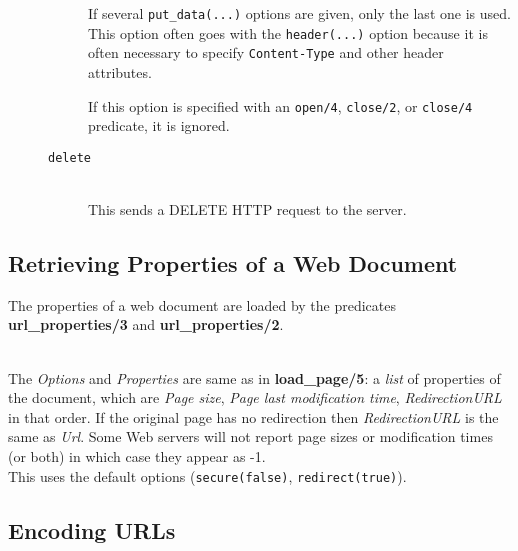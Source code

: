 \begin{description}
\begin{description}
    If several \texttt{put\_data(...)} options are given, only the last one is
    used. This option often goes with the \texttt{header(...)} option because it
    is often necessary to specify \texttt{Content-Type} and other header
    attributes.  

    If this option is specified with an \texttt{open/4},
    \texttt{close/2}, or \texttt{close/4} predicate, it is
    ignored.
  \item[\tt delete] \mbox{} \\
    This sends a DELETE HTTP request to the server.
  \end{description}

\end{description}

\subsection{Retrieving Properties of a Web Document}

The properties of a web document are loaded by the predicates {\bf
  url\_properties/3} and {\bf url\_properties/2}. 

\begin{description}

  \\
  The {\it Options} and {\it Properties} are same as in {\bf load\_page/5}:
  a \emph{list} of properties of the document, which
  are {\it Page size}, {\it Page last modification time}, \emph{RedirectionURL} 
  in that order. If the original page has no redirection then
  \emph{RedirectionURL} is the same as \emph{Url}. 
  Some Web servers will not report page sizes or modification times (or
  both) in which case they appear as -1.
  \\
  This uses the default options (\texttt{secure(false)}, \texttt{redirect(true)}). 

\end{description}

\subsection{Encoding URLs}


